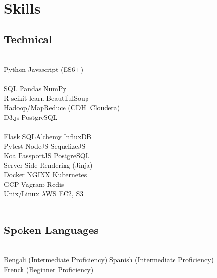 \documentclass[]{deedy-resume-openfont}
\begin{document}
\begin{minipage}[t]{0.31\textwidth}
\\[1\baselineskip]


\section{Skills}
\subsection{Technical}
\\[1\baselineskip]

Python \textbullet{} Javascript (ES6+) \\
\\[1\baselineskip]

SQL \textbullet{} Pandas \textbullet{} NumPy \\
R \textbullet{} scikit-learn \textbullet{} BeautifulSoup \\
Hadoop/MapReduce (CDH, Cloudera) \\
D3.js \textbullet{} PostgreSQL \\
\\[1\baselineskip]

Flask \textbullet{} SQLAlchemy \textbullet{} InfluxDB \\
Pytest \textbullet{} NodeJS \textbullet{} SequelizeJS   \\
Koa \textbullet{} PassportJS \textbullet{} PostgreSQL\\
Server-Side Rendering (Jinja)
\\[1\baselineskip]

Docker \textbullet{} NGINX \textbullet{} Kubernetes \\
GCP \textbullet{} Vagrant \textbullet{} Redis\\
Unix/Linux \textbullet{} AWS EC2, S3 \\
\\[1\baselineskip]


\subsection{Spoken Languages}
\\[1\baselineskip]
Bengali (Intermediate Proficiency)
Spanish (Intermediate Proficiency) \\
French (Beginner Proficiency)\\


%
%

\end{minipage}
\end{document}
